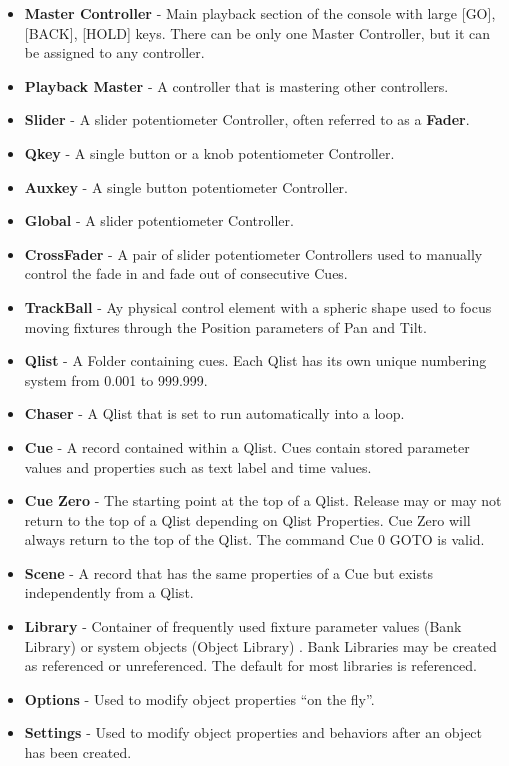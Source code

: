\documentclass[
]{article}
\begin{document}
\begin{itemize}
\item
  \textbf{Master Controller} - Main playback section of the console with large {[}GO{]}, {[}BACK{]}, {[}HOLD{]} keys. There can be only one Master Controller, but it can be assigned to any controller.
\item
  \textbf{Playback Master} - A controller that is mastering other controllers.
\item
  \textbf{Slider} - A slider potentiometer Controller, often referred to as a \textbf{Fader}.
\item
  \textbf{Qkey} - A single button or a knob potentiometer Controller.
\item
  \textbf{Auxkey} - A single button potentiometer Controller.
\item
  \textbf{Global} - A slider potentiometer Controller.
\item
  \textbf{CrossFader} - A pair of slider potentiometer Controllers used to manually control the fade in and fade out of consecutive Cues.
\item
  \textbf{TrackBall} - Ay physical control element with a spheric shape used to focus moving fixtures through the Position parameters of Pan and Tilt.
\item
  \textbf{Qlist} - A Folder containing cues. Each Qlist has its own unique numbering system from 0.001 to 999.999.
\item
  \textbf{Chaser} - A Qlist that is set to run automatically into a loop.
\item
  \textbf{Cue} - A record contained within a Qlist. Cues contain stored parameter values and properties such as text label and time values.
\item
  \textbf{Cue Zero} - The starting point at the top of a Qlist. Release may or may not return to the top of a Qlist depending on Qlist Properties. Cue Zero will always return to the top of the Qlist. The command Cue 0 GOTO is valid.
\item
  \textbf{Scene} - A record that has the same properties of a Cue but exists independently from a Qlist.
\item
  \textbf{Library} - Container of frequently used fixture parameter values (Bank Library) or system objects (Object Library) . Bank Libraries may be created as referenced or unreferenced. The default for most libraries is referenced.
\item
  \textbf{Options} - Used to modify object properties ``on the fly''.
\item
  \textbf{Settings} - Used to modify object properties and behaviors after an object has been created.
\end{itemize}
\end{document}
